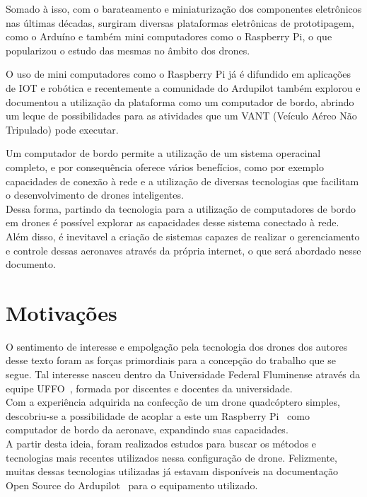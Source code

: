 \documentclass[12pt,a4paper,oneside]{book}
\begin{document}
Somado à isso, com o barateamento e miniaturização dos componentes eletrônicos nas últimas décadas, surgiram diversas plataformas eletrônicas de prototipagem, como o Arduíno e também mini computadores como o Raspberry Pi, o que popularizou o estudo das mesmas no âmbito dos drones. 

O uso de mini computadores como o Raspberry Pi já é difundido em aplicações de IOT e robótica e recentemente a comunidade do Ardupilot também explorou e documentou a utilização da plataforma como um computador de bordo, abrindo um leque de possibilidades para as atividades que um VANT (Veículo Aéreo Não Tripulado) pode executar. 

Um computador de bordo permite a utilização de um sistema operacinal completo, e por consequência oferece vários benefícios, como por exemplo capacidades de conexão à rede e a utilização de diversas tecnologias que facilitam o desenvolvimento de drones inteligentes.\\

Dessa forma, partindo da tecnologia para a utilização de computadores de bordo em drones é possível explorar as capacidades desse sistema conectado à rede. Além disso, é inevitavel a criação de sistemas capazes de realizar o gerenciamento e controle dessas aeronaves através da própria internet, o que será abordado nesse documento.

\section{Motivações}

O sentimento de interesse e empolgação pela tecnologia dos drones dos autores desse texto foram as forças primordiais para a concepção 
do trabalho que se segue. Tal interesse nasceu dentro da Universidade Federal Fluminense através da equipe UFFO~\cite{url:equipeuffo}, 
formada por discentes e docentes da universidade.\\
Com a experiência adquirida na confecção de um drone quadcóptero simples, descobriu-se a possibilidade de acoplar a este um 
Raspberry Pi~\cite{url:raspberrypi} como computador de bordo da aeronave, expandindo suas capacidades.\\
A partir desta ideia, foram realizados estudos para buscar os métodos e tecnologias mais recentes utilizados nessa configuração de drone. 
Felizmente, muitas dessas tecnologias utilizadas já estavam disponíveis na documentação Open Source do Ardupilot~\cite{url:ardupilotdoc} 
para o equipamento utilizado.
\end{document}
